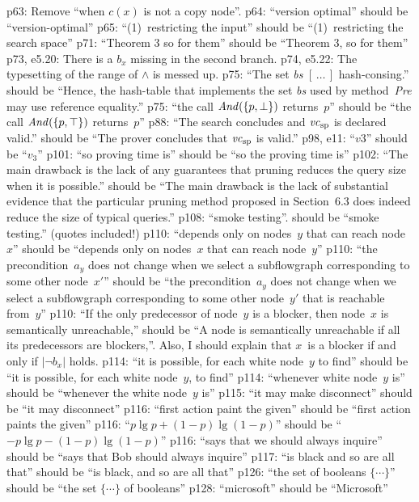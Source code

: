 \e p63: Remove ``when $c(x)$ is not a copy node''.
\e p64: ``version optimal'' should be ``version-optimal''
\e p65: ``(1)~restricting the input'' should be ``(1)~restricting the
  search space''
\e p71: ``Theorem 3 so for them'' should be ``Theorem 3, so for them''
\e p73, e5.20: There is a $b_x$ missing in the second branch.
\e p74, e5.22: The typesetting of the range of $\land$ is messed up.
\e p75: ``The set {\it bs\/} $[\,\ldots\,]$ hash-consing.'' should be ``Hence, the
  hash-table that implements the set {\it bs\/} used by method~{\it Pre} may
  use reference equality.''
\e p75: ``the call ${\it And}(\{p,\bot\})$ returns~$p$'' should be
  ``the call ${\it And}(\{p,\top\})$ returns~$p$''
\e p88: ``The search concludes and ${\it vc}_{\rm sp}$ is declared valid.''
  should be ``The prover concludes that ${\it vc}_{\rm sp}$ is valid.''
\e p98, e11: ``$v3$'' should be ``$v_3$''
\e p101: ``so proving time is'' should be ``so the proving time is'' 
\e p102: ``The main drawback is the lack of any guarantees that pruning
  reduces the query size when it is possible.'' should be ``The main
  drawback is the lack of substantial evidence that the particular 
  pruning method proposed in Section~6.3 does indeed reduce the size
  of typical queries.''
\e p108: ``smoke testing''. should be ``smoke testing.'' (quotes included!)
\e p110: ``depends only on nodes~$y$ that can reach node~$x$'' should be
  ``depends only on nodes~$x$ that can reach node~$y$''
\e p110: ``the precondition~$a_y$ does not change when we select a
  subflowgraph corresponding to some other node~$x'$'' should be
  ``the precondition~$a_y$ does not change when we select a subflowgraph
  corresponding to some other node~$y'$ that is reachable from~$y$''
\e p110: ``If the only predecessor of node~$y$ is a blocker, then node~$x$
  is semantically unreachable,'' should be ``A node is semantically
  unreachable if all its predecessors are blockers,''. Also, I should
  explain that $x$~is a blocker if and only if $|\lnot b_x|$ holds.
\e p114: ``it is possible, for each white node~$y$ to find'' should be
  ``it is possible, for each white node~$y$, to find''
\e p114: ``whenever white node~$y$ is'' should be ``whenever the white
  node~$y$ is''
\e p115: ``it may make disconnect'' should be ``it may disconnect''
\e p116: ``first action paint the given'' should be ``first action paints
  the given''
\e p116: ``$p\lg p+(1-p)\lg(1-p)$'' should be ``$-p\lg p-(1-p)\lg(1-p)$''
\e p116: ``says that we should always inquire'' should be ``says that Bob
  should always inquire''
\e p117: ``is black and so are all that'' should be ``is black, and so are 
  all that''
\e p126: ``the set of booleans $\{\cdots\}$'' should be ``the set $\{\cdots\}$
  of booleans''
\e p128: ``microsoft'' should be ``Microsoft''

\bye
